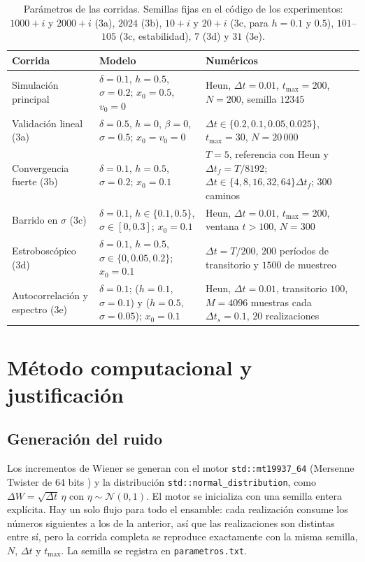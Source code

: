 \documentclass[12pt,a4paper]{article}
\begin{document}
\begin{table}[H]
\centering
\footnotesize
\setlength{\tabcolsep}{3pt}
\begin{tabular}{@{}p{3.1cm}p{5.2cm}p{6.6cm}@{}}
\toprule
Corrida & Modelo & Numéricos\\
\midrule
Simulación principal & $\delta=0.1$, $h=0.5$, $\sigma=0.2$; $x_0=0.5$, $v_0=0$ & Heun, $\Delta t=0.01$, $t_{\max}=200$, $N=200$, semilla $12345$\\
Validación lineal (3a) & $\delta=0.5$, $h=0$, $\beta=0$, $\sigma=0.5$; $x_0=v_0=0$ & $\Delta t\in\{0.2,0.1,0.05,0.025\}$, $t_{\max}=30$, $N=20\,000$\\
Convergencia fuerte (3b) & $\delta=0.1$, $h=0.5$, $\sigma=0.2$; $x_0=0.1$ & $T=5$, referencia con Heun y $\Delta t_f=T/8192$; $\Delta t\in\{4,8,16,32,64\}\Delta t_f$; $300$ caminos\\
Barrido en $\sigma$ (3c) & $\delta=0.1$, $h\in\{0.1,0.5\}$, $\sigma\in[0,0.3]$; $x_0=0.1$ & Heun, $\Delta t=0.01$, $t_{\max}=200$, ventana $t>100$, $N=300$\\
Estroboscópico (3d) & $\delta=0.1$, $h=0.5$, $\sigma\in\{0,0.05,0.2\}$; $x_0=0.1$ & $\Delta t=T/200$, $200$ períodos de transitorio y $1500$ de muestreo\\
Autocorrelación y espectro (3e) & $\delta=0.1$; ($h=0.1$, $\sigma=0.1$) y ($h=0.5$, $\sigma=0.05$); $x_0=0.1$ & Heun, $\Delta t=0.01$, transitorio $100$, $M=4096$ muestras cada $\Delta t_s=0.1$, $20$ realizaciones\\
\bottomrule
\end{tabular}
\caption{Parámetros de las corridas. Semillas fijas en el código de los experimentos: $1000+i$ y $2000+i$ (3a), $2024$ (3b), $10+i$ y $20+i$ (3c, para $h=0.1$ y $0.5$), $101$--$105$ (3c, estabilidad), $7$ (3d) y $31$ (3e).}
\label{tab:param}
\end{table}

\section{Método computacional y justificación}

\subsection{Generación del ruido}

Los incrementos de Wiener se generan con el motor \texttt{std::mt19937\_64} (Mersenne Twister de 64 bits \cite{matsumoto1998}) y la distribución \texttt{std::normal\_distribution}, como $\Delta W=\sqrt{\Delta t}\,\eta$ con $\eta\sim\mathcal N(0,1)$. El motor se inicializa con una semilla entera explícita. Hay un solo flujo para todo el ensamble: cada realización consume los números siguientes a los de la anterior, así que las realizaciones son distintas entre sí, pero la corrida completa se reproduce exactamente con la misma semilla, $N$, $\Delta t$ y $t_{\max}$. La semilla se registra en \texttt{parametros.txt}.
\end{document}
